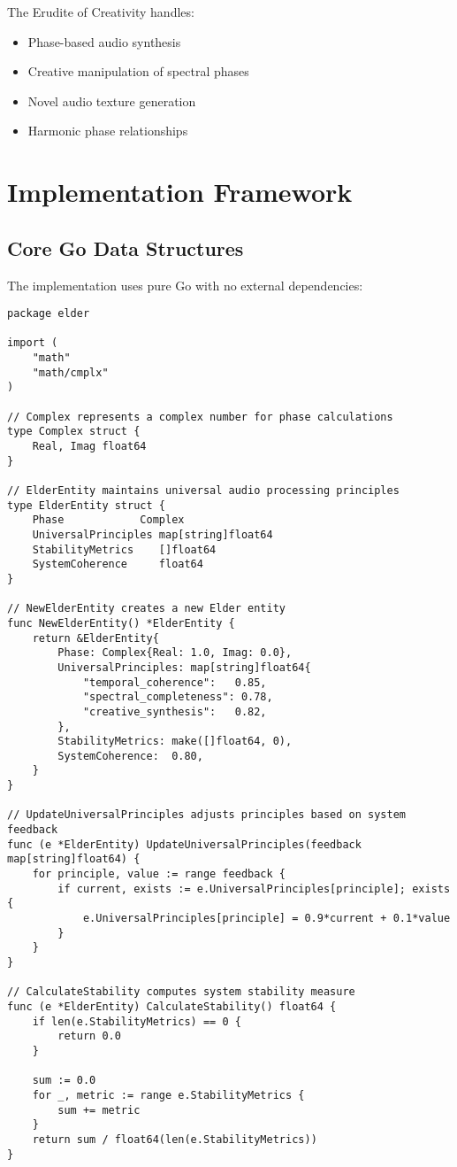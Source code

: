 The Erudite of Creativity handles:
\begin{itemize}
    \item Phase-based audio synthesis
    \item Creative manipulation of spectral phases
    \item Novel audio texture generation
    \item Harmonic phase relationships
\end{itemize}

\section{Implementation Framework}

\subsection{Core Go Data Structures}

The implementation uses pure Go with no external dependencies:

\begin{tcolorbox}[colback=CodeBackground, colframe=DarkGray, title=Elder Entity Implementation, fonttitle=\bfseries]
\begin{verbatim}
package elder

import (
    "math"
    "math/cmplx"
)

// Complex represents a complex number for phase calculations
type Complex struct {
    Real, Imag float64
}

// ElderEntity maintains universal audio processing principles
type ElderEntity struct {
    Phase            Complex
    UniversalPrinciples map[string]float64
    StabilityMetrics    []float64
    SystemCoherence     float64
}

// NewElderEntity creates a new Elder entity
func NewElderEntity() *ElderEntity {
    return &ElderEntity{
        Phase: Complex{Real: 1.0, Imag: 0.0},
        UniversalPrinciples: map[string]float64{
            "temporal_coherence":   0.85,
            "spectral_completeness": 0.78,
            "creative_synthesis":   0.82,
        },
        StabilityMetrics: make([]float64, 0),
        SystemCoherence:  0.80,
    }
}

// UpdateUniversalPrinciples adjusts principles based on system feedback
func (e *ElderEntity) UpdateUniversalPrinciples(feedback map[string]float64) {
    for principle, value := range feedback {
        if current, exists := e.UniversalPrinciples[principle]; exists {
            e.UniversalPrinciples[principle] = 0.9*current + 0.1*value
        }
    }
}

// CalculateStability computes system stability measure
func (e *ElderEntity) CalculateStability() float64 {
    if len(e.StabilityMetrics) == 0 {
        return 0.0
    }
    
    sum := 0.0
    for _, metric := range e.StabilityMetrics {
        sum += metric
    }
    return sum / float64(len(e.StabilityMetrics))
}
\end{verbatim}
\end{tcolorbox}

